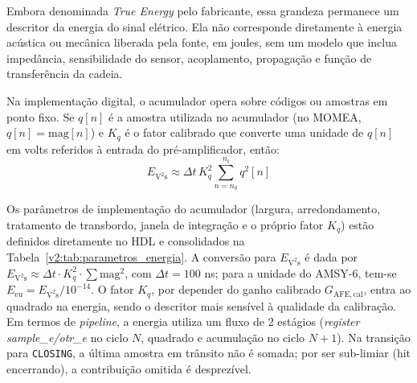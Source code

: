 Embora denominada \textit{True Energy} pelo fabricante, essa grandeza permanece um descritor da energia do sinal elétrico. Ela não corresponde diretamente à energia acústica ou mecânica liberada pela fonte, em joules, sem um modelo que inclua impedância, sensibilidade do sensor, acoplamento, propagação e função de transferência da cadeia.

Na implementação digital, o acumulador opera sobre códigos ou amostras em ponto fixo. Se \(q[n]\) é a amostra utilizada no acumulador (no MOMEA, \(q[n] = \mathrm{mag}[n]\)) e \(K_q\) é o fator calibrado que converte uma unidade de \(q[n]\) em volts referidos à entrada do pré-amplificador, então:
\begin{equation}
	E_{\mathrm{V^2s}} \approx \Delta t\,K_q^2 \sum_{n=n_0}^{n_{\mathrm{f}}} q^2[n]
	\label{v2:eq:energia_codigos_adc}
\end{equation}

Os parâmetros de implementação do acumulador (largura, arredondamento, tratamento de transbordo, janela de integração e o próprio fator \(K_q\)) estão definidos diretamente no HDL e consolidados na Tabela~\ref{v2:tab:parametros_energia}. A conversão para \(E_{\mathrm{V^2s}}\) é dada por \(E_{\mathrm{V^2s}} \approx \Delta t \cdot K_q^2 \cdot \sum \mathrm{mag}^2\), com \(\Delta t = 100\) ns; para a unidade do AMSY-6, tem-se \(E_{\mathrm{eu}} = E_{\mathrm{V^2s}} / 10^{-14}\). O fator \(K_q\), por depender do ganho calibrado \(G_{\mathrm{AFE,cal}}\), entra ao quadrado na energia, sendo o descritor mais sensível à qualidade da calibração. Em termos de \textit{pipeline}, a energia utiliza um fluxo de 2 estágios (\textit{register sample\_e/otr\_e} no ciclo \(N\), quadrado e acumulação no ciclo \(N+1\)). Na transição para \texttt{CLOSING}, a última amostra em trânsito não é somada; por ser sub-limiar (hit encerrando), a contribuição omitida é desprezível.

